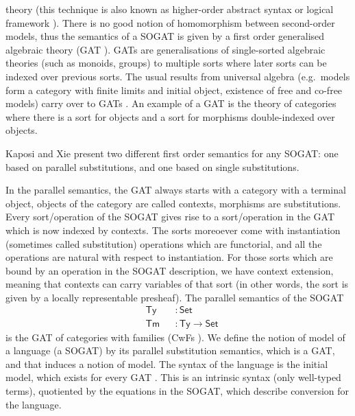 \documentclass[sigplan,10pt,anonymous,review]{acmart}\settopmatter{printfolios=true,printccs=false,printacmref=false}
\newcommand{\ra}{\rightarrow}
\newcommand{\Set}{\mathsf{Set}}
\newcommand{\Ty}{\mathsf{Ty}}
\newcommand{\Tm}{\mathsf{Tm}}
\begin{document}
theory (this technique is also known as higher-order abstract syntax
\cite{DBLP:conf/lics/Hofmann99} or logical framework
\cite{DBLP:journals/jacm/HarperHP93,10.1007/978-3-642-14203-1_2}). There
is no good notion of homomorphism between second-order models, thus
the semantics of a SOGAT is given by a first order generalised
algebraic theory (GAT \cite{DBLP:journals/apal/Cartmell86}). GATs are
generalisations of single-sorted algebraic theories (such as monoids,
groups) to multiple sorts where later sorts can be indexed over
previous sorts. The usual results from universal algebra (e.g.\ models
form a category with finite limits and initial object, existence of
free and co-free models) carry over to GATs
\cite{andras,DBLP:phd/hal/Moeneclaey22}. An example of a GAT is the
theory of categories where there is a sort for objects and a sort for
morphisms double-indexed over objects.

Kaposi and Xie \cite{DBLP:conf/fscd/KaposiX24} present two different
first order semantics for any SOGAT: one based on parallel
substitutions, and one based on single substitutions.

In the parallel semantics, the GAT always starts with a category with
a terminal object, objects of the category are called contexts,
morphisms are substitutions. Every sort/operation of the SOGAT gives
rise to a sort/operation in the GAT which is now indexed by
contexts. The sorts moreoever come with instantiation (sometimes
called substitution) operations which are functorial, and all the
operations are natural with respect to instantiation. For those sorts
which are bound by an operation in the SOGAT description, we have
context extension, meaning that contexts can carry variables of that
sort (in other words, the sort is given by a locally representable
presheaf). The parallel semantics of the SOGAT
\begin{equation}\label{eq:tytm}
\begin{alignedat}{10}
  & \Ty && : \Set \\
  & \Tm && : \Ty \ra\Set 
\end{alignedat}
\end{equation}
is the GAT of categories with families (CwFs
\cite{DBLP:conf/types/Dybjer95,Castellan2021}). We define the notion
of model of a language (a SOGAT) by its parallel substitution
semantics, which is a GAT, and that induces a notion of model. The
syntax of the language is the initial model, which exists for every
GAT \cite{DBLP:journals/pacmpl/KaposiKA19}. This is an intrinsic
syntax (only well-typed terms), quotiented by the equations in the
SOGAT, which describe conversion for the language.
\end{document}
